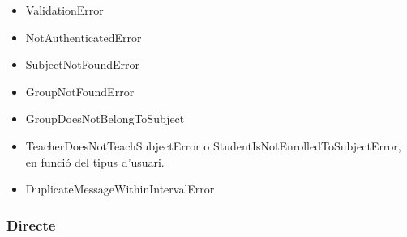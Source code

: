 \begin{itemize}
\begin{itemize}
		\item ValidationError
		\item NotAuthenticatedError
		\item SubjectNotFoundError
		\item GroupNotFoundError
		\item GroupDoesNotBelongToSubject
		\item TeacherDoesNotTeachSubjectError o StudentIsNotEnrolledToSubjectError, en funció del tipus d'usuari.
		\item DuplicateMessageWithinIntervalError

	\end{itemize}
	\end{itemize}
	
	\subsubsection{Directe}
